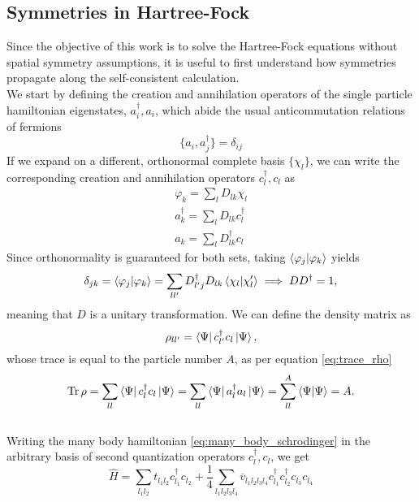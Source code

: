 \subsection{Symmetries in Hartree-Fock}
Since the objective of this work is to solve the Hartree-Fock equations without spatial symmetry assumptions, it is useful to first understand how symmetries propagate along the self-consistent calculation.
\\We start by defining the creation and annihilation operators of the single particle hamiltonian eigenstates, $a_i^\dagger, a_i$, which abide the usual anticommutation relations of fermions
\begin{equation}
    \label{eq:fermion_anticommutations}
    \{a_i, a_j^\dagger\} = \delta_{ij}
\end{equation}
If we expand on a different, orthonormal complete basis $\{\chi_l\}$, we can write the corresponding creation and annihilation operators $c_l^\dagger, c_l$ as
\begin{align}
    \label{eq:basis_change}
    \varphi_k = \sum_l D_{lk} \chi_l\\
    a_k^\dagger = \sum_l D_{lk} c_l^\dagger\\
    a_k = \sum_l D_{lk}^\dagger c_l
\end{align}
Since orthonormality is guaranteed for both sets, taking $\bra{\varphi_j}\ket{\varphi_k}$ yields 
\begin{equation}
    \delta_{jk} = \bra{\varphi_j}\ket{\varphi_k} = \sum_{ll'} D_{l'j}^\dagger D_{lk}\bra{\chi_l}\ket{\chi_l'}\implies DD^\dagger = 1,
\end{equation}
meaning that $D$ is a unitary transformation.
We can define the density matrix as
\begin{equation}
    \label{eq:density_op}
    \rho_{ll'} = \bra{\Psi}c_{l'}^\dagger c_l\ket{\Psi},
\end{equation}
whose trace is equal to the particle number $A$, as per equation \eqref{eq:trace_rho}
\begin{equation}
    \label{eq:trace_rho}
   \Tr \rho =  \sum_{ll}\bra{\Psi}c_{l}^\dagger c_l\ket{\Psi} = \sum_{ll}\bra{\Psi}a_l^\dagger a_l\ket{\Psi} = \sum_{ll}^A \bra{\Psi}\ket{\Psi} = A.
\end{equation}
\\Writing the many body hamiltonian \eqref{eq:many_body_schrodinger} in the arbitrary basis of second quantization operators $c_l^\dagger, c_l$, we get
\begin{equation}
    \label{eq:mb_hamiltonian_sq}
    \hat H = \sum_{l_1 l_2}t_{l_1l_2} c_{l_1}^\dagger c_{l_2} + \frac 1 4 \sum_{l_1 l_2 l_3 l_4}\overline{v}_{l_1l_2l_3l_4} c_{l_1}^\dagger c_{l_2}^\dagger c_{l_3} c_{l_4}
\end{equation}
